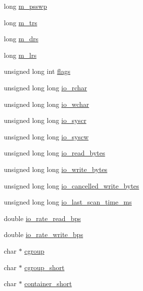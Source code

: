 \begin{DoxyCompactItemize}
long \hyperlink{structLinuxProcess___a03d09465f675a748900a8c6cdfacb08d}{m\+\_\+psswp}
\item 
long \hyperlink{structLinuxProcess___a3de56bc172fd3cdc30e60dd26a5803eb}{m\+\_\+trs}
\item 
long \hyperlink{structLinuxProcess___a9c6429f299e97c1691140b619072da39}{m\+\_\+drs}
\item 
long \hyperlink{structLinuxProcess___af426ccba3b0ad0275911ae33949d6478}{m\+\_\+lrs}
\item 
unsigned long int \hyperlink{structLinuxProcess___ac99d7f7e7a5189206f78729966ff1021}{flags}
\item 
unsigned long long \hyperlink{structLinuxProcess___af4e0f8eeeef431f47bf474beca48a5df}{io\+\_\+rchar}
\item 
unsigned long long \hyperlink{structLinuxProcess___a47c13bfe130d9f02fd4875e528adc57e}{io\+\_\+wchar}
\item 
unsigned long long \hyperlink{structLinuxProcess___a2e3044ffc7ce5fdb5a44775fdc580677}{io\+\_\+syscr}
\item 
unsigned long long \hyperlink{structLinuxProcess___a85002566fe0063f8fa2a7739d72d04f9}{io\+\_\+syscw}
\item 
unsigned long long \hyperlink{structLinuxProcess___afc0b3bc77d88397c477b47689406c332}{io\+\_\+read\+\_\+bytes}
\item 
unsigned long long \hyperlink{structLinuxProcess___aaebf3e127e873e20c8dcdfb7efa9e86f}{io\+\_\+write\+\_\+bytes}
\item 
unsigned long long \hyperlink{structLinuxProcess___a816c9a55e8208c3d582856491d9c5dda}{io\+\_\+cancelled\+\_\+write\+\_\+bytes}
\item 
unsigned long long \hyperlink{structLinuxProcess___a1162ad1614e1489051d2958b1a719479}{io\+\_\+last\+\_\+scan\+\_\+time\+\_\+ms}
\item 
double \hyperlink{structLinuxProcess___a05327bea198e7ce0b4b68a4cc5d69439}{io\+\_\+rate\+\_\+read\+\_\+bps}
\item 
double \hyperlink{structLinuxProcess___a8ba933ae93c24d98980ce95780411535}{io\+\_\+rate\+\_\+write\+\_\+bps}
\item 
char $\ast$ \hyperlink{structLinuxProcess___a7e33ec84943481b5ceb54ac9a53c3593}{cgroup}
\item 
char $\ast$ \hyperlink{structLinuxProcess___af4568df3c642193a1c501eccc055d9f3}{cgroup\+\_\+short}
\item 
char $\ast$ \hyperlink{structLinuxProcess___ad757344fbc8224be47269eea94693624}{container\+\_\+short}

\end{DoxyCompactItemize}

